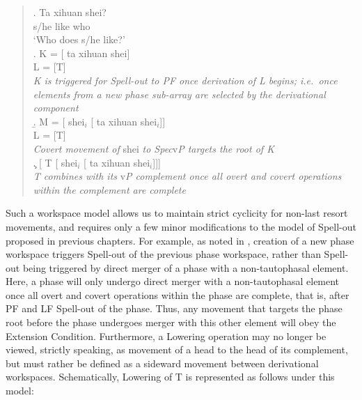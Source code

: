 \singlespacing
\begin{quote}
\exg. Ta xihuan shei?\\
s/he like who\\
`Who does s/he like?'\\
\a. K = [ ta xihuan shei]\\
L = [T]\\{\it K is triggered for Spell-out to PF once derivation of L begins; i.e.\ once elements from a new phase sub-array are selected by the derivational component}\\
\b. M = [ shei$_{i}$ [ ta xihuan shei$_{i}$]]\\
L = [T]\\{\it Covert movement of} shei {\it to Spec}v{\it P targets the root of K}\\
\c. [ T [ shei$_{i}$ [ ta xihuan shei$_{i}$]]]\\{\it T combines with its} v{\it P complement once all overt and covert operations within the complement are complete}

\end{quote}
\onehalfspacing
Such a workspace model allows us to maintain strict cyclicity for non-last resort movements, and requires only a few minor modifications to the model of Spell-out proposed in previous chapters. For example, as noted in \Last[a], creation of a new phase workspace triggers Spell-out of the previous phase workspace, rather than Spell-out being triggered by direct merger of a phase with a non-tautophasal element. Here, a phase will only undergo direct merger with a non-tautophasal element once all overt and covert operations within the phase are complete, that is, after PF and LF Spell-out of the phase. Thus, any movement that targets the phase root before the phase undergoes merger with this other element will obey the Extension Condition. Furthermore, a Lowering operation may no longer be viewed, strictly speaking, as movement of a head to the head of its complement, but must rather be defined as a sideward movement between derivational workspaces. Schematically, Lowering of T is represented as follows under this model:

